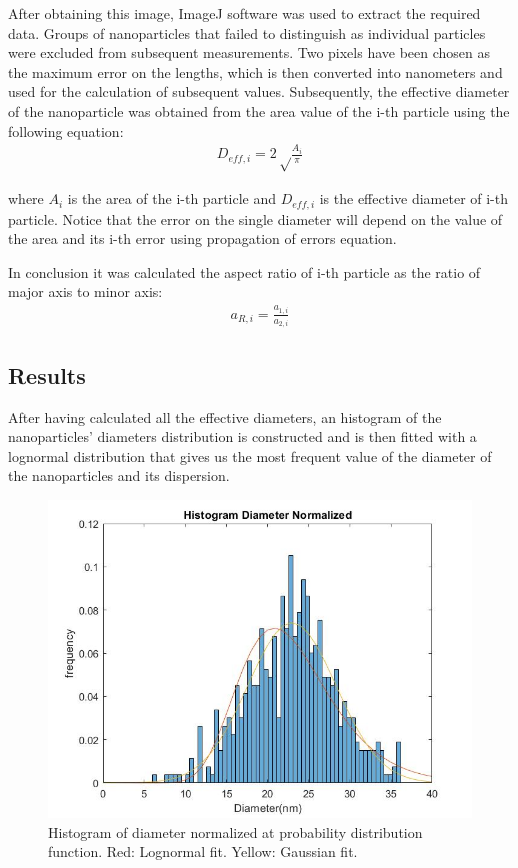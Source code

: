 \documentclass[twocolumn]{article}
\begin{document}
\begin{multicols}{2}
After obtaining this image, ImageJ software was used to extract the required data. Groups of nanoparticles that failed to distinguish as individual particles were excluded from subsequent measurements. Two pixels have been chosen as the maximum error on the lengths, which is then converted into nanometers and used for the calculation of subsequent values.
Subsequently, the effective diameter of the nanoparticle was obtained from the area value of the i-th particle using the following equation:
\begin{align*}
D_{eff,i}=2\sqrt\frac{A_{i}}{\pi}
\end{align*}

where $A_i$ is the area of the i-th particle and $D_{eff,i}$ is the effective diameter of i-th particle. Notice that the error on the single diameter will depend on the value of the area and its i-th error using propagation of errors equation.

In conclusion it was calculated the aspect ratio of i-th particle as the ratio of major axis to minor axis:
\begin{align*}
a_{R,i}=\frac{a_{1,i}}{a_{2,i}}
\end{align*}

\subsection{Results}
After having calculated all the effective diameters, an histogram of the nanoparticles' diameters distribution is constructed and is then fitted with a lognormal distribution that gives us the most frequent value of the diameter of the nanoparticles and its dispersion.

\begin{figure}[H]
    \centering
    \includegraphics[width=\linewidth]{image/data/fitlognorm.jpg}
    \caption{Histogram of diameter normalized at probability distribution function. Red: Lognormal fit. Yellow: Gaussian fit.}
    \label{fig:diameter_distribution}
\end{figure}


\end{multicols}
\end{document}
